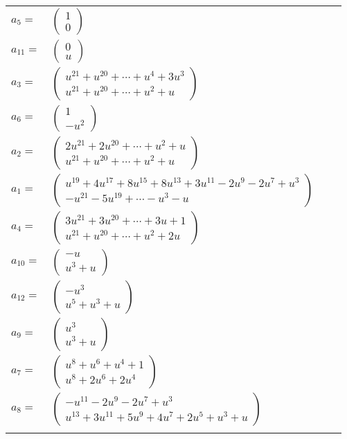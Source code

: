 \documentclass[1p]{elsarticle_modified}
\theoremstyle{definition}
\begin{document}
\begin{tabular}{m{7pt} m{180pt} m{7pt} m{180pt} }
\flushright $a_{5}=$&$\begin{pmatrix}1\\0\end{pmatrix}$ \\
\flushright $a_{11}=$&$\begin{pmatrix}0\\u\end{pmatrix}$ \\
\flushright $a_{3}=$&$\begin{pmatrix}u^{21}+u^{20}+\cdots+u^4+3 u^3\\u^{21}+u^{20}+\cdots+u^2+u\end{pmatrix}$ \\
\flushright $a_{6}=$&$\begin{pmatrix}1\\- u^2\end{pmatrix}$ \\
\flushright $a_{2}=$&$\begin{pmatrix}2 u^{21}+2 u^{20}+\cdots+u^2+u\\u^{21}+u^{20}+\cdots+u^2+u\end{pmatrix}$ \\
\flushright $a_{1}=$&$\begin{pmatrix}u^{19}+4 u^{17}+8 u^{15}+8 u^{13}+3 u^{11}-2 u^9-2 u^7+u^3\\- u^{21}-5 u^{19}+\cdots- u^3- u\end{pmatrix}$ \\
\flushright $a_{4}=$&$\begin{pmatrix}3 u^{21}+3 u^{20}+\cdots+3 u+1\\u^{21}+u^{20}+\cdots+u^2+2 u\end{pmatrix}$ \\
\flushright $a_{10}=$&$\begin{pmatrix}- u\\u^3+u\end{pmatrix}$ \\
\flushright $a_{12}=$&$\begin{pmatrix}- u^3\\u^5+u^3+u\end{pmatrix}$ \\
\flushright $a_{9}=$&$\begin{pmatrix}u^3\\u^3+u\end{pmatrix}$ \\
\flushright $a_{7}=$&$\begin{pmatrix}u^8+u^6+u^4+1\\u^8+2 u^6+2 u^4\end{pmatrix}$ \\
\flushright $a_{8}=$&$\begin{pmatrix}- u^{11}-2 u^9-2 u^7+u^3\\u^{13}+3 u^{11}+5 u^9+4 u^7+2 u^5+u^3+u\end{pmatrix}$\\&\end{tabular}
\end{document}
